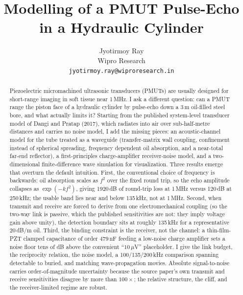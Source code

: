 \documentclass{article}
\title{Modelling of a PMUT Pulse-Echo in a Hydraulic Cylinder}
\author{%
  Jyotirmoy Ray \\
  Wipro Research \\
  \texttt{jyotirmoy.ray@wiproresearch.in}
}
\newcommand{\oilB}{120}     %
\newcommand{\oilC}{1920}    %
\newcommand{\Cs}{479\,nF}
\newcommand{\fbound}{135}   %
\begin{document}
\maketitle

\begin{abstract}
Piezoelectric micromachined ultrasonic transducers (PMUTs) are usually designed for
short-range imaging in soft tissue near 1\,MHz. I ask a different question: can a PMUT
range the piston face of a hydraulic cylinder by pulse-echo down a 3\,m oil-filled steel
bore, and what actually limits it? Starting from the published system-level transducer model of Dangi and Pratap (2017),
which radiates into air over sub-half-metre distances and carries no noise model, I add
the missing pieces: an acoustic-channel model for the tube treated as a waveguide
(transfer-matrix wall coupling, confinement instead of spherical spreading, frequency
dependent oil absorption, and a near-total far-end reflector), a first-principles
charge-amplifier receiver-noise model, and a two-dimensional finite-difference wave
simulation for visualization. Three results emerge that overturn the default intuition.
First, the conventional choice of frequency is backwards: oil absorption scales as
$f^2$ over the fixed round trip, so the echo amplitude collapses as $\exp(-k f^2)$, giving
\oilC\,dB of round-trip loss at 1\,MHz versus \oilB\,dB at 250\,kHz; the usable band lies
near and below \fbound\,kHz, not at 1\,MHz. Second, when transmit and receive are forced to
derive from one electromechanical coupling (so the two-way link is passive, which the
published sensitivities are not: they imply voltage gain above unity), the detection
boundary sits at roughly \fbound\,kHz for a representative 20\,dB/m oil. Third, the binding
constraint is the receiver, not the channel: a thin-film-PZT clamped capacitance of order
\Cs{} feeding a low-noise charge amplifier sets a noise floor tens of dB above the
convenient ``$10\,\mu$V'' placeholder. I give the link budget, the reciprocity relation, the
noise model, a 100/\fbound/200\,kHz comparison spanning detectable to buried, and matching
wave-propagation movies. Absolute signal-to-noise carries order-of-magnitude uncertainty
because the source paper's own transmit and receive sensitivities disagree by more than
$100\times$; the relative structure, the cliff, and the receiver-limited regime are robust.
\end{abstract}
\end{document}
